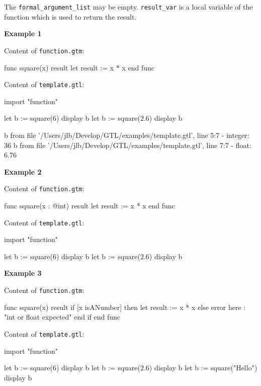 \documentclass[10pt,openright,twosides]{report}
\newcommand{\gtlinline}[1]{\colorbox{light-blue}{\lstinline[language=gtl]{#1}}}
\newcommand{\examplen}[1]{\vspace{.75em}\noindent\textbf{Example #1}\vspace{0em}}
\begin{document}
The \gtlinline{formal_argument_list} may be empty. \gtlinline{result_var} is a local variable of the function which is used to return the result.

\examplen{1}

\noindent Content of \texttt{\footnotesize function.gtm}:
\begin{gtl}
func square(x) result
  let result := x * x
end func
\end{gtl}
\noindent Content of \texttt{\footnotesize template.gtl}:
\begin{gtl}
import "function"

let b := square(6)
display b
let b := square(2.6)
display b
\end{gtl}
\begin{console}
b from file '/Users/jlb/Develop/GTL/examples/template.gtl', line 5:7
  - integer: 36
b from file '/Users/jlb/Develop/GTL/examples/template.gtl', line 7:7
  - float: 6.76
\end{console}

\examplen{2}

\noindent Content of \texttt{\footnotesize function.gtm}:
\begin{gtl}
func square(x : @int) result
  let result := x * x
end func
\end{gtl}
\noindent Content of \texttt{\footnotesize template.gtl}:
\begin{gtl}
import "function"

let b := square(6)
display b
let b := square(2.6)
display b
\end{gtl}

\examplen{3}

\noindent Content of \texttt{\footnotesize function.gtm}:
\begin{gtl}
func square(x) result
  if [x isANumber] then
    let result := x * x
  else
    error here : "int or float expected"
  end if
end func
\end{gtl}
\noindent Content of \texttt{\footnotesize template.gtl}:
\begin{gtl}
import "function"

let b := square(6)
display b
let b := square(2.6)
display b
let b := square("Hello")
display b
\end{gtl}
\end{document}
